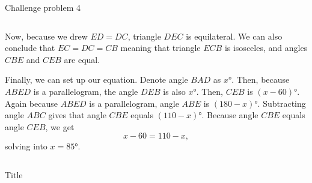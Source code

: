 \documentclass[9pt,aspectratio=169]{beamer}
\begin{document}
\begin{frame}{Challenge problem 4}
\begin{columns}[T]
\begin{column}{0.5\textwidth}
Now, because we drew $ED = DC$, triangle $DEC$ is equilateral. We can also conclude that $EC=DC=CB$ meaning that triangle $ECB$ is isosceles, and angles $CBE$ and $CEB$ are equal.

Finally, we can set up our equation. Denote angle $BAD$ as $x°$. Then, because $ABED$ is a parallelogram, the angle $DEB$ is also $x°$. Then, $CEB$ is $(x-60)°$. Again because $ABED$ is a parallelogram, angle $ABE$ is $(180-x)°$. Subtracting angle $ABC$ gives that angle $CBE$ equals $(110-x)°$. Because angle $CBE$ equals angle $CEB$, we get\[x-60=110-x,\] solving into $x=\boxed{85°}$.
    \end{column}
  \end{columns}
\end{frame}

\begin{frame}{Title}
  \begin{columns}[T]
    \begin{column}{0.5\textwidth}
    \end{column}
    \begin{column}{0.5\textwidth}
    \end{column}
  \end{columns}
\end{frame}
\end{document}
